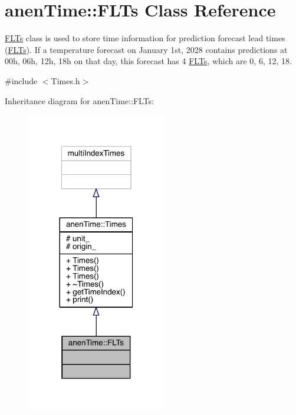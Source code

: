\hypertarget{classanen_time_1_1_f_l_ts}{}\section{anen\+Time\+:\+:F\+L\+Ts Class Reference}
\label{classanen_time_1_1_f_l_ts}


\mbox{\hyperlink{classanen_time_1_1_f_l_ts}{F\+L\+Ts}} class is used to store time information for prediction forecast lead times (\mbox{\hyperlink{classanen_time_1_1_f_l_ts}{F\+L\+Ts}}). If a temperature forecast on January 1st, 2028 contains predictions at 00h, 06h, 12h, 18h on that day, this forecast has 4 \mbox{\hyperlink{classanen_time_1_1_f_l_ts}{F\+L\+Ts}}, which are 0, 6, 12, 18.  




{\ttfamily \#include $<$Times.\+h$>$}



Inheritance diagram for anen\+Time\+:\+:F\+L\+Ts\+:\nopagebreak
\begin{figure}[H]
\begin{center}
\leavevmode
\includegraphics[width=173pt]{classanen_time_1_1_f_l_ts__inherit__graph}
\end{center}
\end{figure}


